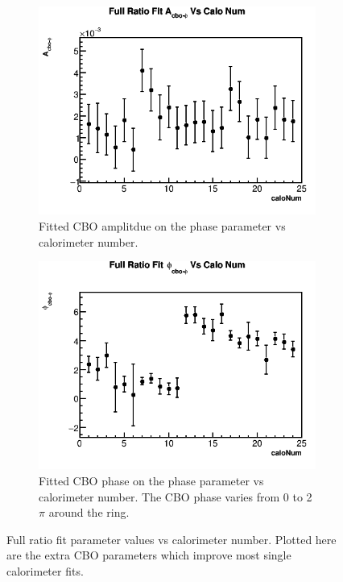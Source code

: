 \begin{figure}[h]
\begin{subfigure}[t]{0.4\textwidth}
	    \end{subfigure}%
	    \vspace{4mm}
	    \begin{subfigure}[t]{0.4\textwidth}
		    \centering
			\includegraphics[width=\textwidth]{RatioCBOFit_A_cbo-phi_Vs_Calo_Canv}
		    \caption{Fitted CBO amplitdue on the \gmtwo phase parameter vs calorimeter number.}
	    \end{subfigure}
	    \hspace{4mm}
	    \begin{subfigure}[t]{0.4\textwidth}
		    \centering
			\includegraphics[width=\textwidth]{RatioCBOFit_phi_cbo-phi_Vs_Calo_Canv}
		    \caption{Fitted CBO phase on the \gmtwo phase parameter vs calorimeter number. The CBO phase varies from 0 to 2$\pi$ around the ring.}
	    \end{subfigure}%
	\caption[PerCaloPlotsExtraCBOParams]{Full ratio fit parameter values vs calorimeter number. Plotted here are the extra CBO parameters which improve most single calorimeter fits.}
	\label{fig:PerCaloPlotsExtraCBOParams}
	\end{figure}

